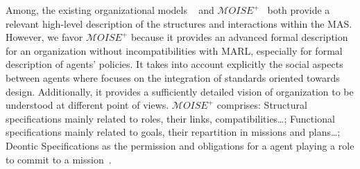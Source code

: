 \documentclass[runningheads]{llncs}
\begin{document}
Among, the existing organizational models ~\cite{Ferber2004} and \allowbreak $\mathcal{M}OISE^+$~\cite{Hubner2002} both provide a relevant high-level description of the structures and interactions within the MAS. However, we favor $\mathcal{M}OISE^+$ because it provides an advanced formal description for an organization without incompatibilities with MARL, especially for formal description of agents' policies. It takes into account explicitly the social aspects between agents where  focuses on the integration of standards oriented towards design. Additionally, it provides a sufficiently detailed vision of organization to be understood at different point of views. $\mathcal{M}OISE^+$ comprises: Structural specifications mainly related to roles, their links, compatibilities\dots; Functional specifications mainly related to goals, their repartition in missions and plans\dots; Deontic Specifications as the permission and obligations for a agent playing a role to commit to a mission~\cite{Hubner2002}.





\end{document}

